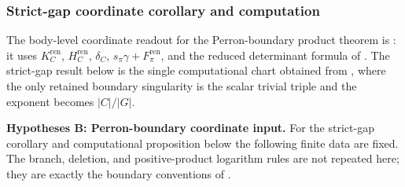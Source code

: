 \subsubsection{Strict-gap coordinate corollary and computation}

The body-level coordinate readout for the Perron-boundary product theorem is
: it uses
\(K_C^{\mathrm{ren}}\), \(H_C^{\mathrm{ren}}\),
\(\delta_C\), \(s_\pi\gamma+F_\pi^{\mathrm{ren}}\), and the reduced
determinant formula of .  The
strict-gap result below is the single computational chart obtained from
, where the only retained boundary
singularity is the scalar trivial triple and the exponent becomes
\(|C|/|G|\).

\noindent\textbf{Hypotheses B: Perron-boundary coordinate input.}
For the strict-gap corollary and computational proposition below the following
finite data are fixed.  The branch, deletion, and positive-product logarithm
rules are not repeated here; they are exactly the boundary conventions of
.
